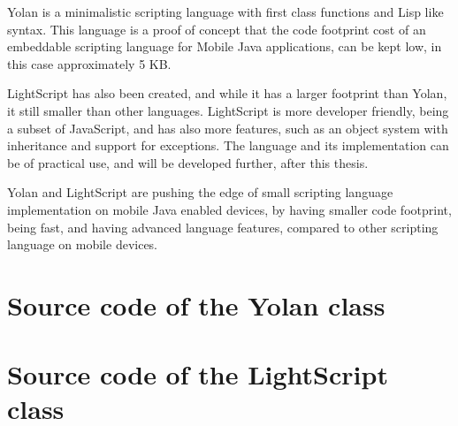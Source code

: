 \documentclass[11pt]{report}
\begin{document}
Yolan is a minimalistic scripting language with first class functions and Lisp like syntax. This language is a proof of concept that the code footprint cost of an embeddable scripting language for Mobile Java applications, can be kept low, in this case approximately 5 KB.

LightScript has also been created, and while it has a larger footprint than Yolan, it still smaller than other languages. LightScript is more developer friendly, being a subset of JavaScript, and has also more features, such as an object system with inheritance and support for exceptions.
The language and its implementation can be of practical use, and will be developed further, after this thesis.

Yolan and LightScript are pushing the edge of small scripting language implementation on mobile Java enabled devices, by having smaller code footprint, being fast, and having advanced language features, compared to other scripting language on mobile devices.


%
%

\newpage
{}



\appendix

%

\chapter{Source code of the Yolan class}


\chapter{Source code of the LightScript class}



\newpage
{}
\printindex
\end{document}
